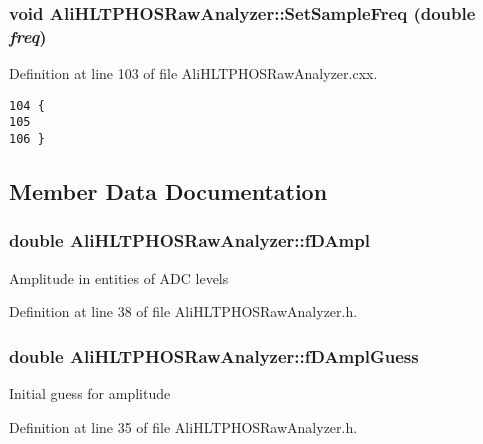 \subsubsection{\setlength{\rightskip}{0pt plus 5cm}void Ali\-HLTPHOSRaw\-Analyzer::Set\-Sample\-Freq (double {\em freq})\hspace{0.3cm}{\tt  [inherited]}}\label{classAliHLTPHOSRawAnalyzer_AliHLTPHOSRawAnalyzerPeakFindera13}




Definition at line 103 of file Ali\-HLTPHOSRaw\-Analyzer.cxx.

\footnotesize\begin{verbatim}104 {
105 
106 }
\end{verbatim}\normalsize 




\subsection{Member Data Documentation}
\subsubsection{\setlength{\rightskip}{0pt plus 5cm}double {\bf Ali\-HLTPHOSRaw\-Analyzer::f\-DAmpl}\hspace{0.3cm}{\tt  [protected, inherited]}}\label{classAliHLTPHOSRawAnalyzer_AliHLTPHOSRawAnalyzerPeakFinderp6}


Amplitude in entities of ADC levels 

Definition at line 38 of file Ali\-HLTPHOSRaw\-Analyzer.h.
\subsubsection{\setlength{\rightskip}{0pt plus 5cm}double {\bf Ali\-HLTPHOSRaw\-Analyzer::f\-DAmpl\-Guess}\hspace{0.3cm}{\tt  [protected, inherited]}}\label{classAliHLTPHOSRawAnalyzer_AliHLTPHOSRawAnalyzerPeakFinderp3}


Initial guess for amplitude 

Definition at line 35 of file Ali\-HLTPHOSRaw\-Analyzer.h.
